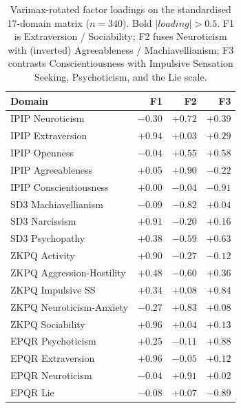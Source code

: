 \documentclass[11pt]{article}
\begin{document}
\begin{table}[t]
\centering
\small
\begin{tabular}{lrrr}
\toprule
Domain & F1 & F2 & F3 \\
\midrule
IPIP Neuroticism                  & $-0.30$       & $\mathbf{+0.72}$ & $+0.39$       \\
IPIP Extraversion                 & $\mathbf{+0.94}$ & $+0.03$       & $+0.29$       \\
IPIP Openness                     & $-0.04$       & $\mathbf{+0.55}$ & $\mathbf{+0.58}$ \\
IPIP Agreeableness                & $+0.05$       & $\mathbf{+0.90}$ & $-0.22$       \\
IPIP Conscientiousness            & $+0.00$       & $-0.04$       & $\mathbf{-0.91}$ \\
SD3 Machiavellianism              & $-0.09$       & $\mathbf{-0.82}$ & $+0.04$       \\
SD3 Narcissism                    & $\mathbf{+0.91}$ & $-0.20$       & $+0.16$       \\
SD3 Psychopathy                   & $+0.38$       & $\mathbf{-0.59}$ & $\mathbf{+0.63}$ \\
ZKPQ Activity                     & $\mathbf{+0.90}$ & $-0.27$       & $-0.12$       \\
ZKPQ Aggression-Hostility         & $+0.48$       & $\mathbf{-0.60}$ & $+0.36$       \\
ZKPQ Impulsive SS                 & $+0.34$       & $+0.08$       & $\mathbf{+0.84}$ \\
ZKPQ Neuroticism-Anxiety          & $-0.27$       & $\mathbf{+0.83}$ & $+0.08$       \\
ZKPQ Sociability                  & $\mathbf{+0.96}$ & $+0.04$       & $+0.13$       \\
EPQR Psychoticism                 & $+0.25$       & $-0.11$       & $\mathbf{+0.88}$ \\
EPQR Extraversion                 & $\mathbf{+0.96}$ & $-0.05$       & $+0.12$       \\
EPQR Neuroticism                  & $-0.04$       & $\mathbf{+0.91}$ & $+0.02$       \\
EPQR Lie                          & $-0.08$       & $+0.07$       & $\mathbf{-0.89}$ \\
\bottomrule
\end{tabular}
\caption{Varimax-rotated factor loadings on the standardised 17-domain matrix ($n=340$). Bold $|loading| > 0.5$. F1 is Extraversion / Sociability; F2 fuses Neuroticism with (inverted) Agreeableness / Machiavellianism; F3 contrasts Conscientiousness with Impulsive Sensation Seeking, Psychoticism, and the Lie scale.}
\label{tab:efa-loadings}
\end{table}
\end{document}
